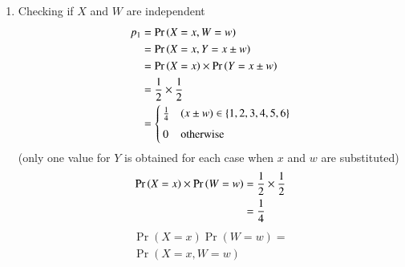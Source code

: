 \documentclass[journal,12pt,twocolumn]{IEEEtran}
\begin{document}
\begin{enumerate}
    \item Checking if $X$ and $W$ are independent
\begin{align}
    p_1 &= \Pr\left(X=x,W=w\right)\\
        &= \Pr\left(X=x,Y=x\pm w\right)\\
        &=\Pr\left(X=x\right)\times\Pr\left(Y=x\pm w\right)\\
        &= \frac{1}{2}\times\frac{1}{2}\\
        &= \begin{cases}
        \frac{1}{4} & (x\pm w) \in \{1, 2, 3, 4, 5, 6\}\\ ~\\[-1em]
        0 & \text{otherwise}
    \end{cases}
\end{align}
(only one value for $Y$ is obtained for each case when $x$ and $w$ are substituted)
\begin{align}
    \Pr\left(X=x\right)\times\Pr\left(W=w\right) &= \frac{1}{2} \times\frac{1}{2} \\
                           &= \frac{1}{4}
\end{align}
\begin{multline}
    \Pr{(X=x)}\Pr{(W=w)} =\\ \Pr{(X=x,W=w)}
\end{multline}


\end{enumerate}
\end{document}
